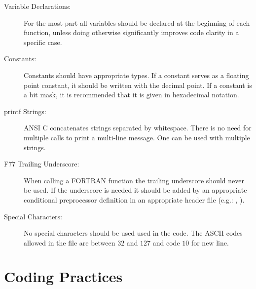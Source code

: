 \begin{description}
\item[Variable Declarations:]
For the most part all variables should be declared at the beginning of each
function, unless doing otherwise significantly improves code clarity in
a specific case.

\item[Constants:]
Constants should have appropriate types. If a constant serves as a floating
point constant, it should be written with the decimal point.
If a constant is a bit mask, it is recommended that it is given in
hexadecimal notation.

\item[printf Strings:]
ANSI C concatenates strings separated by whitespace. There is no need for
multiple  calls to print a multi-line message. One 
can be used with multiple strings.

\item[F77 Trailing Underscore:]
When calling a FORTRAN function the trailing underscore should never be used.
If the underscore is needed it should be added by an appropriate conditional
preprocessor definition in an appropriate header file (e.g.: ,
).

\item[Special Characters:]
No special characters should be used used in the code. The ASCII
codes allowed in the file are between $32$ and $127$ and code $10$
for new line.
\end{description}


\section{Coding Practices}


